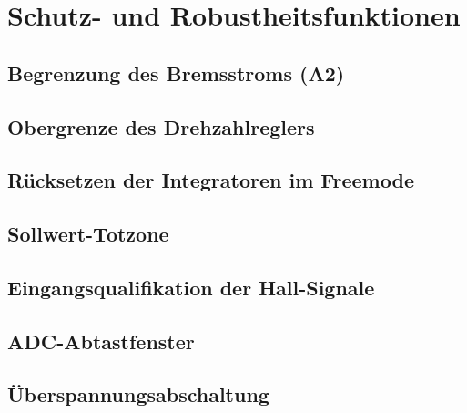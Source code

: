 \chapter{Schutz- und Robustheitsfunktionen}
\label{ch:schutz}

\section{Begrenzung des Bremsstroms (A2)}

\section{Obergrenze des Drehzahlreglers}

\section{Rücksetzen der Integratoren im Freemode}

\section{Sollwert-Totzone}

\section{Eingangsqualifikation der Hall-Signale}

\section{ADC-Abtastfenster}

\section{Überspannungsabschaltung}
